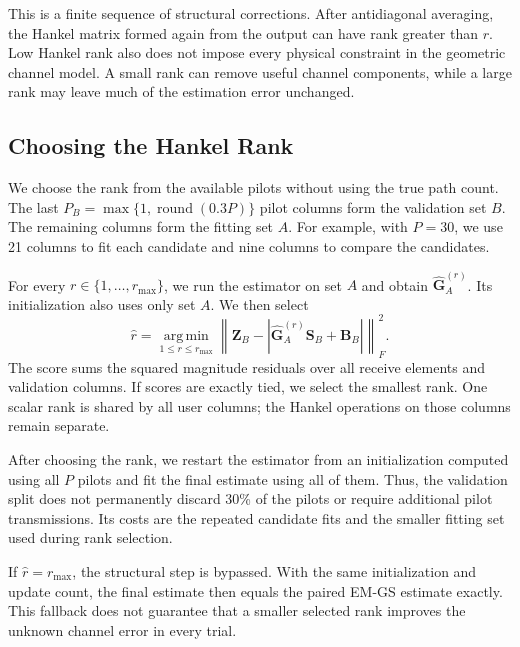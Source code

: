 \documentclass[journal]{IEEEtran}
\begin{document}
This is a finite sequence of structural corrections. After antidiagonal
averaging, the Hankel matrix formed again from the output can have rank
greater than $r$. Low Hankel rank also does not impose every physical
constraint in the geometric channel model. A small rank can remove useful
channel components, while a large rank may leave much of the estimation
error unchanged.

\subsection{Choosing the Hankel Rank}
\label{sec:revised-rank-selection}

We choose the rank from the available pilots without using the true path
count. The last $P_B=\max\{1,\operatorname{round}(0.3P)\}$ pilot columns
form the validation set $B$. The remaining columns form the fitting set
$A$. For example, with $P=30$, we use 21 columns to fit each candidate and
nine columns to compare the candidates.

For every $r\in\{1,\ldots,r_{\max}\}$, we run the estimator on set $A$
and obtain $\widehat{\mathbf G}^{(r)}_A$. Its initialization also uses only
set $A$. We then select
\begin{equation}
\widehat r=\operatorname*{arg\,min}_{1\leq r\leq r_{\max}}
\left\|\mathbf Z_B-
 \left|\widehat{\mathbf G}^{(r)}_A\mathbf S_B+\mathbf B_B\right|
\right\|_F^2.
\label{eq:revision-rank-selection}
\end{equation}
The score sums the squared magnitude residuals over all receive elements
and validation columns. If scores are exactly tied, we select the smallest
rank. One scalar rank is shared by all user columns; the Hankel operations
on those columns remain separate.

After choosing the rank, we restart the estimator from an initialization
computed using all $P$ pilots and fit the final estimate using all of them.
Thus, the validation split does not permanently discard 30\% of the pilots
or require additional pilot transmissions. Its costs are the repeated
candidate fits and the smaller fitting set used during rank selection.

If $\widehat r=r_{\max}$, the structural step is bypassed. With the same
initialization and update count, the final estimate then equals the paired
EM-GS estimate exactly. This fallback does not guarantee that a smaller
selected rank improves the unknown channel error in every trial.
\end{document}
